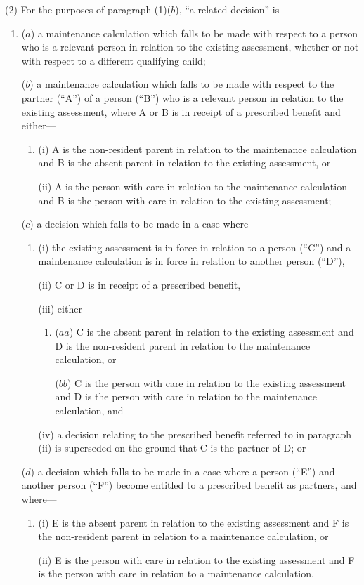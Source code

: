\documentclass[12pt,a4paper]{article}
\begin{document}
(2) For the purposes of paragraph (1)($b$), “a related decision” is—
\begin{enumerate}\item[]
($a$) a maintenance calculation which falls to be made with respect to a person who is a relevant person in relation to the existing assessment, whether or not with respect to a different qualifying child;

($b$) a maintenance calculation which falls to be made with respect to the partner (“A”) of a person (“B”) who is a relevant person in relation to the existing assessment, where A or B is in receipt of a prescribed benefit and either—
\begin{enumerate}\item[]
(i) A is the non-resident parent in relation to the maintenance calculation and B is the absent parent in relation to the existing assessment, or

(ii) A is the person with care in relation to the maintenance calculation and B is the person with care in relation to the existing assessment;
\end{enumerate}

($c$) a decision which falls to be made in a case where—
\begin{enumerate}\item[]
(i) the existing assessment is in force in relation to a person (“C”) and a maintenance calculation is in force in relation to another person (“D”),

(ii) C or D is in receipt of a prescribed benefit,

(iii) either—
\begin{enumerate}\item[]
($aa$) C is the absent parent in relation to the existing assessment and D is the non-resident parent in relation to the maintenance calculation, or

($bb$) C is the person with care in relation to the existing assessment and D is the person with care in relation to the maintenance calculation, and
\end{enumerate}

(iv) a decision relating to the prescribed benefit referred to in paragraph (ii)  is superseded on the ground that C is the partner of D; or
\end{enumerate}

($d$) a decision which falls to be made in a case where a person (“E”) and another person (“F”) become entitled to a prescribed benefit as partners, and where—
\begin{enumerate}\item[]
(i) E is the absent parent in relation to the existing assessment and F is the non-resident parent in relation to a maintenance calculation, or

(ii) E is the person with care in relation to the existing assessment and F is the person with care in relation to a maintenance calculation.
\end{enumerate}
\end{enumerate}
\end{document}
